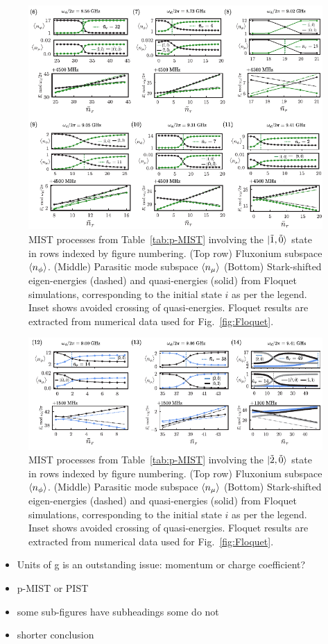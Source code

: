 \documentclass[%
reprint,
superscriptaddress,
 amsmath,amssymb,
 aps,
 prx,
longbibliography,
floatfix,
]{revtex4-2}
\begin{document}
\begin{figure}
    \centering
    \includegraphics[width=1.0\textwidth]{Supp_Fig/Trans1.pdf}
    \caption{MIST processes from Table~\ref{tab:p-MIST} involving the $\ket{\tilde{1},\tilde{0}}$ state in rows indexed by figure numbering. (Top row) Fluxonium subspace $\braket{n_\phi}$. (Middle) Parasitic mode subspace $\braket{n_\mu}$ (Bottom) Stark-shifted eigen-energies (dashed) and quasi-energies (solid) from Floquet simulations, corresponding to the initial state $i$ as per the legend. Inset shows avoided crossing of quasi-energies. Floquet results are extracted from numerical data used for Fig.~\ref{fig:Floquet}.}
    \label{fig:Trans1}
\end{figure}
\begin{figure}
    \centering
    \includegraphics[width=1.0\textwidth]{Supp_Fig/Trans2.pdf}
    \caption{MIST processes from Table~\ref{tab:p-MIST} involving the $\ket{\tilde{2},\tilde{0}}$ state in rows indexed by figure numbering. (Top row) Fluxonium subspace $\braket{n_\phi}$. (Middle) Parasitic mode subspace $\braket{n_\mu}$ (Bottom) Stark-shifted eigen-energies (dashed) and quasi-energies (solid) from Floquet simulations, corresponding to the initial state $i$ as per the legend. Inset shows avoided crossing of quasi-energies. Floquet results are extracted from numerical data used for Fig.~\ref{fig:Floquet}.}
    \label{fig:Trans2}
\end{figure}

\clearpage
\begin{itemize}
    \item Units of g is an outstanding issue: momentum or charge coefficient?
    \item p-MIST or PIST
    \item some sub-figures have subheadings some do not
    \item shorter conclusion
\end{itemize}
\clearpage
 
\end{document}
